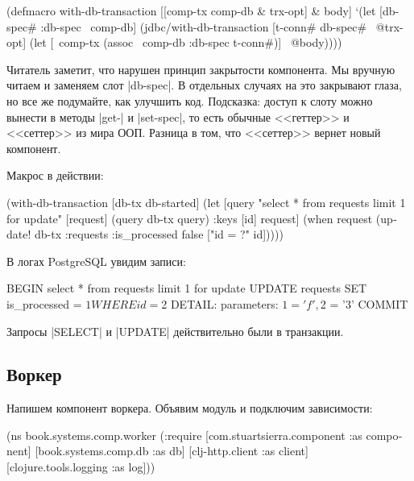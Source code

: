 \begin{english}
  \begin{clojure}
(defmacro with-db-transaction
  [[comp-tx comp-db & trx-opt] & body]
  `(let [{db-spec# :db-spec} ~comp-db]
     (jdbc/with-db-transaction
       [t-conn# db-spec# ~@trx-opt]
       (let [~comp-tx (assoc ~comp-db :db-spec t-conn#)]
         ~@body))))
  \end{clojure}
\end{english}

Читатель заметит, что нарушен принцип закрытости компонента. Мы вручную читаем и
заменяем слот \spverb|db-spec|. В отдельных случаях на это закрывают глаза,
но все же подумайте, как улучшить код. Подсказка: доступ к слоту можно вынести в
методы \spverb|get-| и \spverb|set-spec|, то есть обычные <<геттер>> и
<<сеттер>> из мира ООП. Разница в том, что <<сеттер>> вернет новый компонент.

Макрос в действии:

\begin{english}
  \begin{clojure}
(with-db-transaction
  [db-tx db-started]
  (let [query "select * from requests limit 1 for update"
        [request] (query db-tx query)
        {:keys [id]} request]
    (when request
      (update! db-tx :requests
               {:is_processed false}
               ["id = ?" id]))))
  \end{clojure}
\end{english}

\noindent
В логах PostgreSQL увидим записи:

\begin{english}
  \begin{sql}
BEGIN
select * from requests limit 1 for update
UPDATE requests SET is_processed = $1 WHERE id = $2
DETAIL:  parameters: $1 = 'f', $2 = '3'
COMMIT
  \end{sql}
\end{english}

\noindent
Запросы \spverb|SELECT| и \spverb|UPDATE| действительно были в транзакции.

\subsection{Воркер}

Напишем компонент воркера. Объявим модуль и подключим зависимости:

\begin{english}
  \begin{clojure}
(ns book.systems.comp.worker
  (:require
   [com.stuartsierra.component :as component]
   [book.systems.comp.db :as db]
   [clj-http.client :as client]
   [clojure.tools.logging :as log]))
  \end{clojure}
\end{english}

